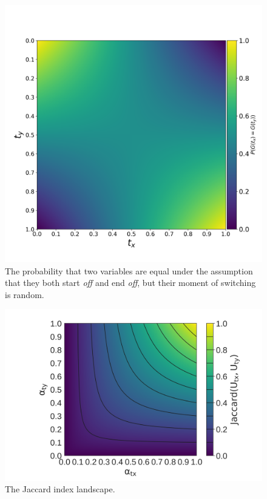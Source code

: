\begin{figure}[H]
    \includegraphics[width=\linewidth]{ch4.hourglass/images/math_inverse.png}
    \caption{The probability that two variables are equal under the assumption that they both start \textit{off} and end \textit{off}, but their moment of switching is random.}
    \label{fig:inverse_math}
\end{figure}

\begin{figure}[H]
    \includegraphics[width=\linewidth]{ch4.hourglass/images/math_flies.png}
    \caption{The Jaccard index landscape.}
    \label{fig:peak_math}
\end{figure}

